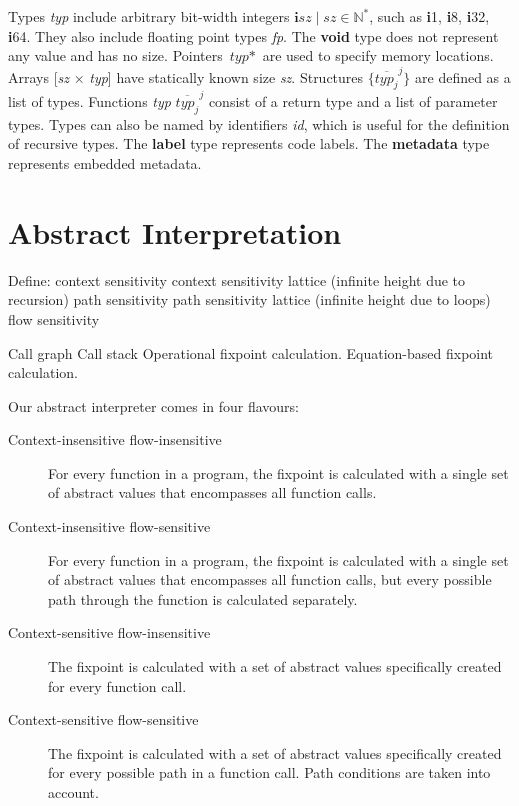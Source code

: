 \documentclass[a4paper]{book}
\begin{document}
Types \textit{typ} include arbitrary bit-width integers
$\textbf{i}\textit{sz} \mid \textit{sz} \in \mathbb{N}^*$, such as
\textbf{i}1, \textbf{i}8, \textbf{i}32, \textbf{i}64.  They also
include floating point types \textit{fp}.  The \textbf{void} type does
not represent any value and has no size.  Pointers $\textit{typ}*$ are
used to specify memory locations.  Arrays [\textit{sz} $\times$
  \textit{typ}] have statically known size \textit{sz}.  Structures
$\big\{\overline{\textit{typ}_j}^j\big\}$ are defined as a list of
types.  Functions \textit{typ} $\overline{\textit{typ}_j}^j$ consist
of a return type and a list of parameter types.  Types can also be
named by identifiers \textit{id}, which is useful for the definition
of recursive types.  The \textbf{label} type represents code labels.
The \textbf{metadata} type represents embedded metadata.

\chapter{Abstract Interpretation}

Define:
context sensitivity
context sensitivity lattice (infinite height due to recursion)
path sensitivity
path sensitivity lattice (infinite height due to loops)
flow sensitivity

Call graph
Call stack
Operational fixpoint calculation.
Equation-based fixpoint calculation.

Our abstract interpreter comes in four flavours:
\begin{description}
\item[Context-insensitive flow-insensitive] For every function in a
  program, the fixpoint is calculated with a single set of abstract
  values that encompasses all function calls.
\item[Context-insensitive flow-sensitive] For every function in a
  program, the fixpoint is calculated with a single set of abstract
  values that encompasses all function calls, but every possible path
  through the function is calculated separately.
\item[Context-sensitive flow-insensitive] The fixpoint is calculated
  with a set of abstract values specifically created for every
  function call.
\item[Context-sensitive flow-sensitive] The fixpoint is calculated
  with a set of abstract values specifically created for every
  possible path in a function call.  Path conditions are taken into
  account.
\end{description}
\end{document}
